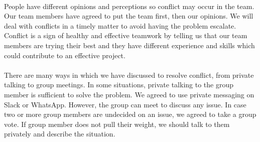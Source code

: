 \documentclass[11pt, a4paper]{article}
\begin{document}
\paragraph{}
People have different opinions and perceptions so conflict may occur in the team. Our team members have agreed to put the team first, then our opinions. We will deal with conflicts in a timely matter to avoid having the problem escalate. Conflict is a sign of healthy and effective teamwork by telling us that our team members are trying their best and they have different experience and skills which could contribute to an effective project.
\paragraph{}
There are many ways in which we have discussed to resolve conflict, from private talking to group meetings. In some situations, private talking to the group member is sufficient to solve the problem. We agreed to use private messaging on Slack or WhatsApp. However, the group can meet to discuss any issue. In case two or more group members are undecided on an issue, we agreed to take a group vote. If group member does not pull their weight, we should talk to them privately and describe the situation.
\end{document}
